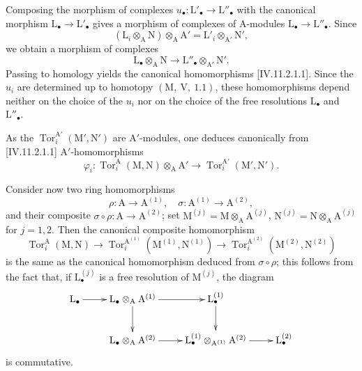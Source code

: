 Composing the morphism of complexes
$u_\bullet:\mathrm{L}'_\bullet\to\mathrm{L}''_\bullet$ with the canonical
morphism $\mathrm{L}_\bullet\to\mathrm{L}'_\bullet$ gives a morphism of
complexes of $\mathrm{A}$-modules
$\mathrm{L}_\bullet\to\mathrm{L}''_\bullet$. Since
\[
  (\mathrm{L}_i\otimes_\mathrm{A}\mathrm{N})
    \otimes_\mathrm{A}\mathrm{A}'
  =\mathrm{L}'_i\otimes_{\mathrm{A}'}\mathrm{N}',
\]
we obtain a morphism of complexes
\[
  \mathrm{L}_\bullet\otimes_\mathrm{A}\mathrm{N}
  \longrightarrow
  \mathrm{L}''_\bullet\otimes_{\mathrm{A}'}\mathrm{N}'.
\]
Passing to homology yields the canonical homomorphisms
[IV.11.2.1.1]. Since the $u_i$ are determined up to
homotopy $(\mathrm{M},~\mathrm{V},~1.1)$, these homomorphisms depend
neither on the choice of the $u_i$ nor on the choice of the free
resolutions $\mathrm{L}_\bullet$ and $\mathrm{L}''_\bullet$.

As the $\operatorname{Tor}_i^{\mathrm{A}'}(\mathrm{M}',\mathrm{N}')$ are $\mathrm{A}'$-modules, one deduces canonically from [IV.11.2.1.1] $\mathrm{A}'$-homomorphisms
\begin{equation}
  \varphi_i:\operatorname{Tor}_i^\mathrm{A}(\mathrm{M},\mathrm{N})\otimes_\mathrm{A}\mathrm{A}'\to\operatorname{Tor}_i^{\mathrm{A}'}(\mathrm{M}',\mathrm{N}').
  \label{IV.11.2.1.5}
\tag{11.2.1.5}
\end{equation}

Consider now two ring homomorphisms
\[
  \rho:\mathrm{A}\to\mathrm{A}^{(1)},\quad \sigma:\mathrm{A}^{(1)}\to\mathrm{A}^{(2)},
\]
and their composite $\sigma\circ\rho:\mathrm{A}\to\mathrm{A}^{(2)}$; set $\mathrm{M}^{(j)}=\mathrm{M}\otimes_\mathrm{A}\mathrm{A}^{(j)}$, $\mathrm{N}^{(j)}=\mathrm{N}\otimes_\mathrm{A}\mathrm{A}^{(j)}$ for $j=1,2$. Then the canonical composite homomorphism
\[
  \operatorname{Tor}_i^\mathrm{A}(\mathrm{M},\mathrm{N})
  \longrightarrow
  \operatorname{Tor}_i^{\mathrm{A}^{(1)}}
    (\mathrm{M}^{(1)},\mathrm{N}^{(1)})
  \longrightarrow
  \operatorname{Tor}_i^{\mathrm{A}^{(2)}}
    (\mathrm{M}^{(2)},\mathrm{N}^{(2)})
\]
is the same as the canonical homomorphism deduced from $\sigma\circ\rho$; this follows from the fact that, if $\mathrm{L}_\bullet^{(j)}$ is a free resolution of $\mathrm{M}^{(j)}$, the diagram
\[
\xymatrix{
  \mathrm{L}_\bullet \ar[r] & \mathrm{L}_\bullet\otimes_\mathrm{A}\mathrm{A}^{(1)} \ar[r] \ar[d] & \mathrm{L}_\bullet^{(1)} \ar[d] \\
  & \mathrm{L}_\bullet\otimes_\mathrm{A}\mathrm{A}^{(2)} \ar[r] &
  \mathrm{L}_\bullet^{(1)}\otimes_{\mathrm{A}^{(1)}}\mathrm{A}^{(2)} \ar[r] & \mathrm{L}_\bullet^{(2)}
}
\]
is commutative.

